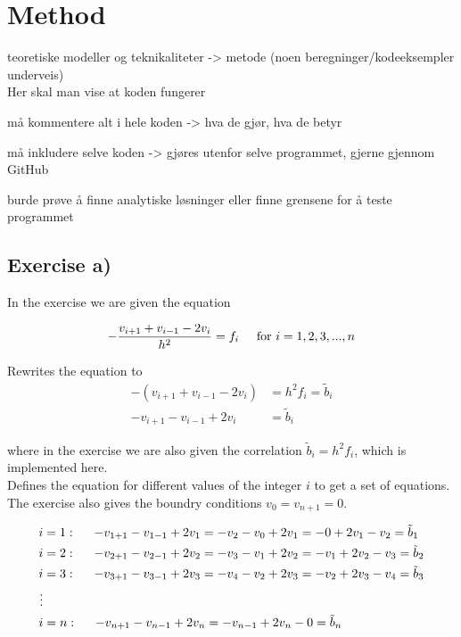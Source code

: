 \documentclass{article}
\begin{document}
\section{Method}

  teoretiske modeller og teknikaliteter -> metode (noen beregninger/kodeeksempler underveis) \\
  Her skal man vise at koden fungerer

  må kommentere alt i hele koden -> hva de gjør, hva de betyr

  må inkludere selve koden -> gjøres utenfor selve programmet, gjerne gjennom GitHub

  burde prøve å finne analytiske løsninger eller finne grensene for å teste programmet

\subsection{Exercise a)}

    In the exercise we are given the equation

    \begin{equation*}
      - \frac{v_{i+1} + v_{i-1} - 2 v_i}{h^2} = f_i \hspace{5mm} \textrm{for} ~  i = 1, 2, 3, ... , n
    \end{equation*}

    Rewrites the equation to
    \begin{align*}
      - (v_{i+1} + v_{i-1} - 2 v_i) &= h^2 f_i = \tilde{b}_i \\
      - v_{i+1} - v_{i-1} + 2 v_i &= \tilde{b}_i
    \end{align*}

    where in the exercise we are also given the correlation $\tilde{b}_i = h^2 f_i$, which is implemented here. \\

    Defines the equation for different values of the integer $i$ to get a set of equations. The exercise also gives the boundry conditions $v_0 = v_{n+1} = 0$.

    \begin{align*}
      i &= 1 : \hspace{5mm} - v_{1+1} - v_{1-1} + 2 v_1 = - v_2 - v_0 + 2 v_1 = - 0 + 2 v_1 - v_2 = \tilde{b}_1 \\
      i &= 2 : \hspace{5mm} - v_{2+1} - v_{2-1} + 2 v_2 = - v_3 - v_1 + 2 v_2 = - v_1 + 2 v_2 - v_3 = \tilde{b}_2 \\
      i &= 3 : \hspace{5mm} - v_{3+1} - v_{3-1} + 2 v_3 = - v_4 - v_2 + 2 v_3 = - v_2 + 2 v_3 - v_4 = \tilde{b}_3 \\
      \vdots \\
      i &= n : \hspace{5mm} - v_{n+1} - v_{n-1} + 2 v_n = - v_{n-1} + 2 v_n - 0 = \tilde{b}_n \\
    \end{align*}
\end{document}
